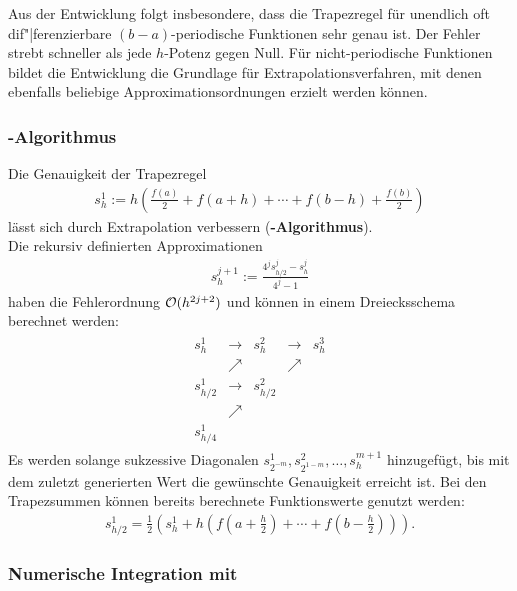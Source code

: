 Aus der Entwicklung folgt insbesondere, dass die Trapezregel für unendlich oft
dif"|ferenzierbare $(b - a)$-periodische Funktionen sehr genau ist.
Der Fehler strebt schneller als jede $h$-Potenz gegen Null.
Für nicht-periodische Funktionen bildet die Entwicklung die Grundlage für
Extrapolationsverfahren, mit denen ebenfalls beliebige
Approximationsordnungen erzielt werden können.

\subsubsection{%
    -Algorithmus%
}

Die Genauigkeit der Trapezregel
\begin{align*}
    s_h^1 := h \left(\frac{f(a)}{2} + f(a + h) + \dotsb +
    f(b - h) + \frac{f(b)}{2}\right)
\end{align*}
lässt sich durch Extrapolation verbessern
(\textbf{-Algorithmus}). \\
Die rekursiv definierten Approximationen
\begin{align*}
    s_h^{j+1} := \frac{4^j s_{h/2}^j - s_h^j}{4^j - 1}
\end{align*}
haben die Fehlerordnung $\mathcal{O}(h^{2j+2})$ und können in einem Dreiecksschema
berechnet werden:
\begin{align*}
    \begin{array}{ccccc}
        s_h^1 & \rightarrow & s_h^2 & \rightarrow & s_h^3 \\
        & \nearrow & & \nearrow \\
        s_{h/2}^1 & \rightarrow & s_{h/2}^2 \\
        & \nearrow \\
        s_{h/4}^1
    \end{array}
\end{align*}
Es werden solange sukzessive Diagonalen
$s_{2^{-m}}^1, s_{2^{1-m}}^2, \dotsc, s_h^{m+1}$ hinzugefügt, bis mit dem
zuletzt generierten Wert die gewünschte Genauigkeit erreicht ist.
Bei den Trapezsummen können bereits berechnete Funktionswerte genutzt werden:
\begin{align*}
    s_{h/2}^1 = \frac{1}{2} \left(s_h^1 +
    h \left(f(a + \tfrac{h}{2}) + \dotsb +
    f\left(b - \tfrac{h}{2}\right)\right)\right).
\end{align*}

\pagebreak

\subsubsection{%
    Numerische Integration mit \matlab{}%
}

